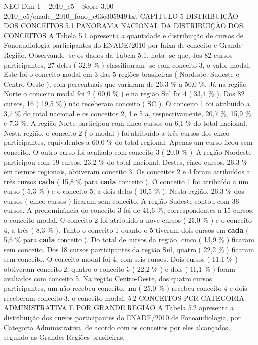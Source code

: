 \begin{textsample}{NEG Dim 1 – 2010\_c5 – Score 3.00 – 2010\_c5/enade\_2010\_fono\_c03e305949.txt}  \label{ex:f1_neg_308}
CAPÍTULO 5 DISTRIBUIÇÃO DOS CONCEITOS 5.1 PANORAMA NACIONAL DA DISTRIBUIÇÃO DOS CONCEITOS A Tabela 5.1 apresenta a quantidade e distribuição de cursos de Fonoaudiologia participantes do ENADE/2010 por faixa de conceito e Grande Região.
Observando -se os dados da Tabela 5.1, nota -se que, dos 82 cursos participantes, 27 deles ( 32,9 \% ) classificaram -se com conceito 3, o valor modal.
Este foi o conceito modal em 3 das 5 regiões brasileiras ( Nordeste, Sudeste e Centro-Oeste ), com percentuais que variaram de 26,3 \% a 50,0 \%.
Já na região Norte o conceito modal foi 2 ( 60,0 \% ) e na região Sul foi 4 ( 33,4 \% ).
Dos 82 cursos, 16 ( 19,5 \% ) não receberam conceito ( SC ).
O conceito 1 foi atribuído a 3,7 \% do total nacional e os conceitos 2, 4 e 5 a, respectivamente, 20,7 \%, 15,9 \% e 7,3 \%.
A região Norte participou com cinco cursos ou 6,1 \% do total nacional.
Nesta região, o conceito 2 ( o modal ) foi atribuído a três cursos dos cinco participantes, equivalentes a 60,0 \% do total regional.
Apenas um curso ficou sem conceito.
O outro curso foi avaliado com conceito 3 ( 20,0 \% ).
A região Nordeste participou com 19 cursos, 23,2 \% do total nacional.
Destes, cinco cursos, 26,3 \% em termos regionais, obtiveram conceito 3.
Os conceitos 2 e 4 foram atribuídos a três cursos \textbf{cada} ( 15,8 \% para \textbf{cada} conceito ).
O conceito 1 foi atribuído a um curso ( 5,3 \% ) e o conceito 5, a dois deles ( 10,5 \% ).
Nesta região, 26,3 \% dos cursos ( cinco cursos ) ficaram sem conceito.
A região Sudeste contou com 36 cursos.
A predominância do conceito 3 foi de 41,6 \%, correspondentes a 15 cursos, o conceito modal.
O conceito 2 foi atribuído a nove cursos ( 25,0 \% ) e o conceito 4, a três ( 8,3 \% ).
Tanto o conceito 1 quanto o 5 tiveram dois cursos em \textbf{cada} ( 5,6 \% para \textbf{cada} conceito ).
Do total de cursos da região, cinco ( 13,9 \% ) ficaram sem conceito.
Dos 18 cursos participantes da região Sul, quatro ( 22,2 \% ) ficaram sem conceito.
O conceito modal foi 4, com seis cursos.
Dois cursos ( 11,1 \% ) obtiveram conceito 2, quatro o conceito 3 ( 22,2 \% ) e dois ( 11,1 \% ) foram avaliados com conceito 5.
Na região Centro-Oeste, dos quatro cursos participantes, um não recebeu conceito, um ( 25,0 \% ) recebeu conceito 4 e dois receberam conceito 3, o conceito modal. 5.2 CONCEITOS POR CATEGORIA ADMINISTRATIVA E POR GRANDE REGIÃO A Tabela 5.2 apresenta a distribuição dos cursos participantes do ENADE/2010 de Fonoaudiologia, por Categoria Administrativa, de acordo com os conceitos por eles alcançados, segundo as Grandes Regiões brasileiras.

\end{textsample}
